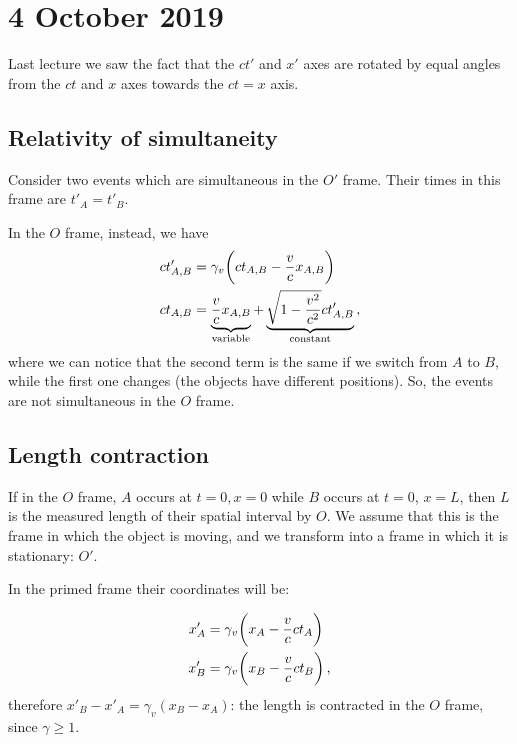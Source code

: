 \documentclass[main.tex]{subfiles}
\begin{document}
\section*{4 October 2019}

Last lecture we saw the fact that the \(ct'\) and \(x'\) axes are rotated by equal angles from the \(ct\) and \(x\) axes towards the \(ct=x\) axis.

\subsection{Relativity of simultaneity}

Consider two events which are simultaneous in the \(O'\) frame. Their times in this frame are \(t'_A = t'_B\).

In the \(O\) frame, instead, we have 
%
\begin{align} 
  ct^{\prime }_{A, B} &= \gamma_{v} \qty(ct_{A, B} - \frac{v}{c} x_{A, B}) \\
  ct_{A, B} &= \underbrace{ \frac{v}{c} x_{A, B}}_{\text{variable}} + \underbrace{\sqrt{1- \frac{v^2}{c^2} } c t_{A, B}'}_{\text{constant}}
\,,
\end{align}
%
where we can notice that the second term is the same if we switch from \(A\) to \(B\), while the first one changes (the objects have different positions). 
So, the events are not simultaneous in the \(O\) frame.

\subsection{Length contraction}

If in the \(O\) frame, \(A\) occurs at \(t = 0, x = 0\) while \(B\) occurs at \(t=0\), \(x=L\), then \(L\) is the measured length of their spatial interval by \(O\). We assume that this is the frame in which the object is moving, and we transform into a frame in which it is stationary: \(O'\).

In the primed frame their coordinates will be:

\begin{subequations}
\begin{align}
  x'_A &= \gamma_v \qty(x_A - \frac{v}{c} c t_A) \\
  x'_B &= \gamma_v \qty(x_B - \frac{v}{c} c t_B) \,,
\end{align}
\end{subequations}
%
therefore \(x'_B - x'_A = \gamma_v (x_B - x_A)\): the length is contracted in the \(O\) frame, since \(\gamma\geq 1\).
\end{document}
